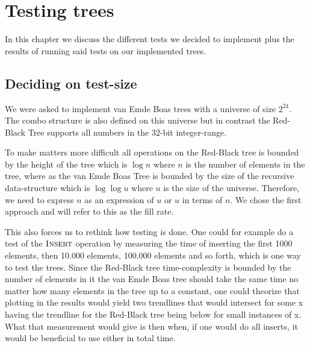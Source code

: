\documentclass[oneside,11pt,openright]{report}
\newcommand{\Insert}{\textsc{Insert}}
\begin{document}
\chapter{Testing trees}

In this chapter we discuss the different tests we decided to implement plus the results of running said tests on our implemented trees. 

\section{Deciding on test-size}
We were asked to implement van Emde Boas trees with a universe of size $2^24$. The combo structure is also defined on this universe but in contrast the Red-Black Tree supports all numbers in the 32-bit integer-range.

To make matters more difficult all operations on the Red-Black tree is bounded by the height of the tree which is $\log n$ where $n$ is the number of elements in the tree, where as the van Emde Boas Tree is bounded by the size of the recursive data-structure which is $\log \log u$ where $u$ is the size of the universe. Therefore, we need to express $n$ as an expression of $u$ or $u$ in terms of $n$. We chose the first approach and will refer to this as the fill rate.

This also forces us to rethink how testing is done. One could for example do a test of the $\Insert$ operation by measuring the time of inserting the first 1000 elements, then 10.000 elements, 100.000 elements and so forth, which is one way to test the trees. Since the Red-Black tree time-complexity is bounded by the number of elements in it the van Emde Boas tree should take the same time no matter how many elements in the tree up to a constant, one could theorize that plotting in the results would yield two trendlines that would intersect for some x having the trendline for the Red-Black tree being below for small instances of x. What that measurement would give is then when, if one would do all inserts, it would be beneficial to use either in total time.
\end{document}
